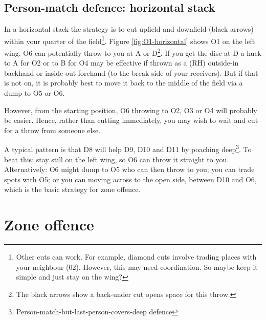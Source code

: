\documentclass{tufte-handout}
\begin{document}
\subsection{Person-match defence: horizontal stack}\label{sec:horizontall}
In a horizontal stack 
the strategy is to cut 
upfield and downfield (black arrows)
within your quarter of the field\footnote{
Other cuts
can work. 
For example, 
diamond cuts 
involve trading places 
with your neighbour
(02). 
However, this may need
coordination. 
So maybe keep it simple 
and just stay on the wing?}. 
Figure \ref{fig:O1-horizontal} shows 
O1 on the left wing. 
O6 
can potentially 
throw to you 
at A 
or D\footnote{
The black arrows
show a back-under cut 
opens space 
for this throw.}. 
If you get the disc 
at D 
a huck to 
A for O2 or 
to B for O4 
may be effective 
if thrown as 
a (RH) outside-in backhand or
inside-out forehand 
(to the break-side of your receivers). 
But if that is not on, 
it is probably best 
to move it 
back to the middle of the field 
via a dump to O5 or O6. 

However, 
from the starting position,
O6 throwing to 
O2, O3 or O4 will probably 
be easier. 
Hence, rather than cutting immediately, 
you may wish to 
wait and 
cut for a throw from someone else. 

A typical pattern
is that D8 will
help D9, D10 and D11 
by poaching deep\footnote{
Person-match-but-last-person-covers-deep defence}. 
To beat this: 
stay still 
on the left wing,
so O6 can throw it 
straight to you. 
Alternatively: 
O6 might dump to O5 who can then throw to you;
you can trade spots with O5;
or you can moving across to the open side, 
between D10 and O6, 
which is the basic strategy 
for zone offence.

\section{Zone offence}\label{sec:zone}
\end{document}
